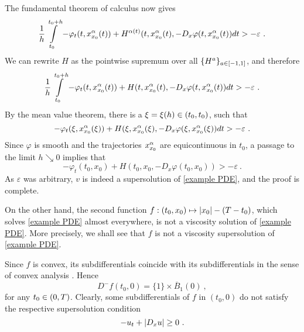 \begin{example}
\begin{equation*}
	\end{equation*}
	The fundamental theorem of calculus now gives
	\begin{equation*}
		\frac{1}{h} \int\limits_{t_0}^{t_0 + h} -\varphi_t(t, x_{x_0}^{\alpha}(t)) + H^{\alpha(t)}(t, x_{x_0}^{\alpha}(t), -D_x \varphi(t, x_{x_0}^{\alpha}(t)) dt > - \varepsilon \ .
	\end{equation*}
	We can rewrite $ H $ as the pointwise supremum over all $ \{H^{a}\}_{a \in \left[ -1, 1 \right]} $, and therefore
	\begin{equation*}
		\frac{1}{h} \int\limits_{t_0}^{t_0 + h} -\varphi_t(t, x_{x_0}^{\alpha}(t)) + H(t, x_{x_0}^{\alpha}(t), -D_x \varphi(t, x_{x_0}^{\alpha}(t)) dt > - \varepsilon \ .
	\end{equation*}
	By the mean value theorem, there is a $ \xi = \xi(h) \in \left(t_0, t_0\right) $, such that
	\begin{equation*}
		-\varphi_t(\xi, x_{x_0}^{\alpha}(\xi)) + H(\xi, x_{x_0}^{\alpha}(\xi), -D_x \varphi(\xi, x_{x_0}^{\alpha}(\xi)) dt > - \varepsilon \ .
	\end{equation*}
	Since $ \varphi $ is smooth and the trajectories $ x_{x_0}^{\alpha} $ are equicontinuous in $ t_0 $, a passage to the limit $ h \searrow 0 $ implies that
	\begin{equation*}
		- \varphi_t (t_0, x_0) + H(t_0, x_0, - D_x \varphi(t_0, x_0)) > - \varepsilon \ .
	\end{equation*}
	As $ \varepsilon $ was arbitrary, $ v $ is indeed a supersolution of \eqref{example PDE}, and the proof is complete.
	
	On the other hand, the second function $ f : (t_0, x_0) \mapsto \left\lvert {x_0} \right\rvert - (T - t_0) $, which solves \eqref{example PDE} almost everywhere, is not a viscosity solution of \eqref{example PDE}. More precisely, we shall see that $ f $ is not a viscosity supersolution of \eqref{example PDE}.
	
	Since $ f $ is convex, its subdifferentials coincide with its subdifferentials in the sense of convex analysis \cite[see exercise 1.3, p~32]{bardi2008optimal}. Hence
	\begin{equation*}
	D^{-}f(t_0, 0) = \{1\} \times \overline{B}_{1}(0) \ ,
	\end{equation*}
	for any $ t_0 \in \left(0, T\right) $. Clearly, some subdifferentials of $ f $ in $ (t_0, 0) $ do not satisfy the respective supersolution condition
	\begin{equation*}
	-u_t + \left\lvert {D_x u} \right\rvert \geq 0 \ .
	\end{equation*}
\end{example}
